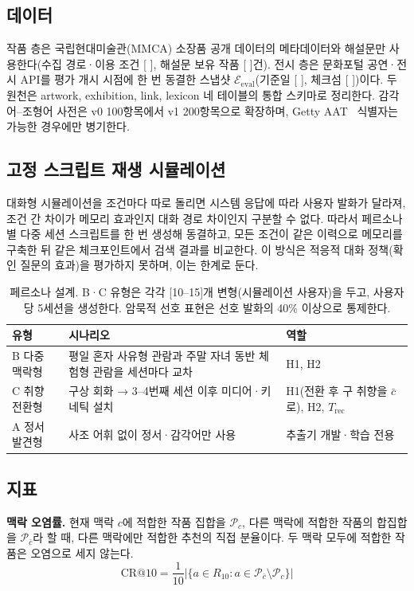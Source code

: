 \documentclass[10pt,twocolumn,letterpaper]{article}
\newcommand{\fillin}[1]{\textcolor{fillc}{[#1]}}
\newcommand{\cE}{\mathcal{E}}
\newcommand{\cP}{\mathcal{P}}
\begin{document}
\subsection{데이터}
작품 층은 국립현대미술관(MMCA) 소장품 공개 데이터의 메타데이터와 해설문만 사용한다(수집 경로·이용 조건 \fillin{ }, 해설문 보유 작품 \fillin{ }건). 전시 층은 문화포털 공연·전시 API를 평가 개시 시점에 한 번 동결한 스냅샷 $\cE_{\mathrm{eval}}$(기준일 \fillin{ }, 체크섬 \fillin{ })이다. 두 원천은 artwork, exhibition, link, lexicon 네 테이블의 통합 스키마로 정리한다. 감각어–조형어 사전은 v0 100항목에서 v1 200항목으로 확장하며, Getty AAT~\cite{getty_aat} 식별자는 가능한 경우에만 병기한다.

\subsection{고정 스크립트 재생 시뮬레이션}
대화형 시뮬레이션을 조건마다 따로 돌리면 시스템 응답에 따라 사용자 발화가 달라져, 조건 간 차이가 메모리 효과인지 대화 경로 차이인지 구분할 수 없다. 따라서 페르소나별 다중 세션 스크립트를 한 번 생성해 동결하고, 모든 조건이 같은 이력으로 메모리를 구축한 뒤 같은 체크포인트에서 검색 결과를 비교한다. 이 방식은 적응적 대화 정책(확인 질문의 효과)을 평가하지 못하며, 이는 한계로 둔다.

\begin{table}[t]
\centering\small
\setlength{\tabcolsep}{4pt}
\begin{tabularx}{\columnwidth}{@{}l >{\raggedright\arraybackslash}X >{\raggedright\arraybackslash}X@{}}
\toprule
유형 & 시나리오 & 역할 \\
\midrule
B 다중 맥락형 & 평일 혼자 사유형 관람과 주말 자녀 동반 체험형 관람을 세션마다 교차 & H1, H2 \\
C 취향 전환형 & 구상 회화 → 3–4번째 세션 이후 미디어·키네틱 설치 & H1(전환 후 구 취향을 $\bar c$로), H2, $T_{\mathrm{rec}}$ \\
A 정서 발견형 & 사조 어휘 없이 정서·감각어만 사용 & 추출기 개발·학습 전용 \\
\bottomrule
\end{tabularx}
\caption{페르소나 설계. B·C 유형은 각각 \fillin{10–15}개 변형(시뮬레이션 사용자)을 두고, 사용자당 5세션을 생성한다. 암묵적 선호 표현은 선호 발화의 40\% 이상으로 통제한다.}
\label{tab:persona}
\end{table}

\subsection{지표}
\textbf{맥락 오염률.} 현재 맥락 $c$에 적합한 작품 집합을 $\cP_c$, 다른 맥락에 적합한 작품의 합집합을 $\cP_{\bar c}$라 할 때, 다른 맥락에만 적합한 추천의 직접 분율이다. 두 맥락 모두에 적합한 작품은 오염으로 세지 않는다.
\begin{equation}
\mathrm{CR@10}=\frac{1}{10}\bigl|\{a\in R_{10}: a\in\cP_{\bar c}\setminus\cP_c\}\bigr|
\label{eq:cr}
\end{equation}
\end{document}
